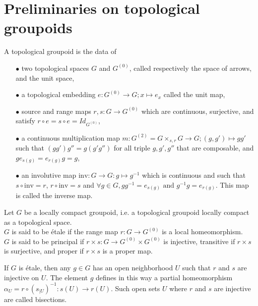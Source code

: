 \section{Preliminaries on topological groupoids}

\begin{definition}
A topological groupoid is the data of 
\begin{itemize}
\item[$\bullet$] two topological spaces $G$ and $G^{(0)}$, called respectively the space of arrows, and the unit space,
\item[$\bullet$] a topological embedding $e: G^{(0)}\rightarrow G; x\mapsto e_x$ called the unit map,
\item[$\bullet$] source and range maps $r,s : G\rightarrow G^{(0)}$ which are continuous, surjective, and satisfy $r\circ e = s\circ e = Id_{G^{(0)}}$,
\item[$\bullet$] a continuous multiplication map $m : G^{(2)}=G\times_{s,r}G\rightarrow G; (g,g')\mapsto gg'$ such that $(gg')g''=g(g'g'')$ for all triple $g,g',g''$ that are composable, and $g e_{s(g)} = e_{r(g)} g =g$,
\item[$\bullet$] an involutive map $\text{inv} : G\rightarrow G: g\mapsto g^{-1}$ which is continuous and such that $s\circ \text{inv} = r$, $r\circ \text{inv} = s$ and $\forall g\in G, gg^{-1}=e_{s(g)} \text{ and }g^{-1}g=e_{r(g)}$. This map is called the inverse map.
\end{itemize} 
\end{definition}

\begin{definition}
Let $G$ be a locally compact groupoid, i.e. a topological groupoid locally compact as a topological space.\\
$G$ is said to be étale if the range map $r:G\rightarrow G^{(0)}$ is a local homeomorphism.\\
$G$ is said to be principal if $r\times s : G\rightarrow G^{(0)}\times G^{(0)}$ is injective, transitive if $r\times s $ is surjective, and proper if $r\times s $ is a proper map. 
\end{definition}

If $G$ is étale, then any $g\in G$ has an open neighborhood $U$ such that $r$ and $s$ are injective on $U$. The element $g$ defines in this way a partial homeomorphism $\alpha_U = r\circ (s_{|U})^{-1} : s(U)\rightarrow r(U)$. Such open sets $U$ where $r$ and $s$ are injective are called bisections.\\ %

